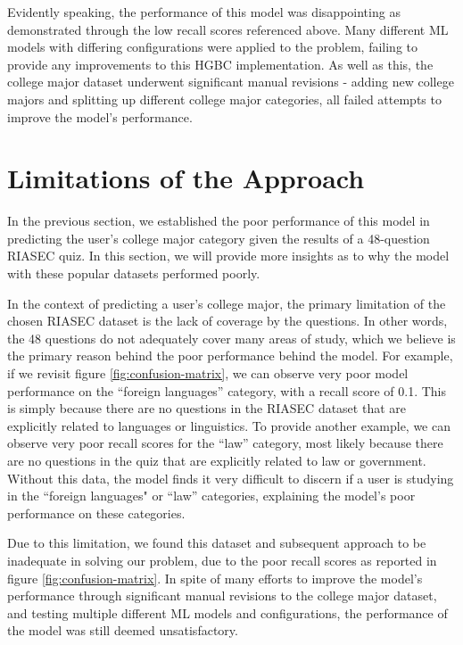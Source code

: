 Evidently speaking, the performance of this model was disappointing as demonstrated through the low recall scores referenced above.
Many different ML models with differing configurations were applied to the problem, failing to provide any improvements to this HGBC implementation.
As well as this, the college major dataset underwent significant manual revisions - adding new college majors and splitting up different college major 
categories, all failed attempts to improve the model's performance.

\section{Limitations of the Approach}

In the previous section, we established the poor performance of this model in predicting the user's college major category given the results of a 48-question RIASEC quiz.
In this section, we will provide more insights as to why the model with these popular datasets performed poorly.

In the context of predicting a user's college major, the primary limitation of the chosen RIASEC dataset is the lack of coverage by the questions.
In other words, the 48 questions do not adequately cover many areas of study,
which we believe is the primary reason behind the poor performance behind the model.
For example, if we revisit figure \ref{fig:confusion-matrix}, we can observe very poor model performance on the ``foreign languages'' category, with a recall score of 0.1.
This is simply because there are no questions in the RIASEC dataset that are explicitly related to languages or linguistics.
To provide another example, we can observe very poor recall scores for the ``law'' category, most likely because
there are no questions in the quiz that are explicitly related to law or government.
Without this data, the model finds it very difficult to discern if a user is studying in the ``foreign languages" or ``law'' categories, explaining the model's poor performance on these categories.

Due to this limitation, we found this dataset and subsequent approach to be inadequate in solving our problem, due to the poor recall scores as reported in figure \ref{fig:confusion-matrix}.
In spite of many efforts to improve the model's performance through significant manual revisions to the college major dataset,
and testing multiple different ML models and configurations,
the performance of the model was still deemed unsatisfactory.

